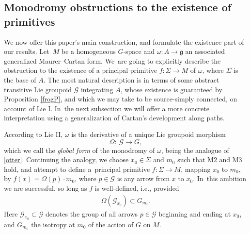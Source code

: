 \documentclass[11pt]{article}
\numberwithin{equation}{section}
\numberwithin{equation}{section}
\begin{document}
\subsection*{Monodromy obstructions to the existence of
 primitives}

We now offer this paper's main construction, and formulate the
existence part of our results. Let~$M$ be a homogeneous $G$-space and
$\omega \colon A \rightarrow {\mathfrak g} $ an associated generalized
Maurer--Cartan form. We~are going to explicitly describe the
obstruction to the existence of a principal primitive
$f \colon \Sigma \rightarrow M $ of $\omega $, where $\Sigma $ is the
base of $A$. The most natural description is in terms of some abstract
transitive Lie groupoid ${\mathcal G}$ integrating $A$, whose
existence is guaranteed by Proposition \ref{frogP}, and which we may
take to be source-simply connected, on account of Lie I. In~the next
subsection we will offer a more concrete interpretation using a
generalization of Cartan's development along paths.

According to Lie II, $\omega $ is the derivative of a unique Lie
groupoid morphism
\begin{equation}\label{global}
 \Omega \colon\ {\mathcal G} \rightarrow G,
\end{equation}
which we call the {\it global form} of the monodromy of $\omega $,
being the analogue of \eqref{otter}. Continuing the analogy, we
choose $x_0 \in \Sigma $ and $m_0$ such that M2 and M3 hold, and
attempt to define a~principal primitive
$f \colon \Sigma \rightarrow M$, mapping $x_0$ to $m_0$, by
$f(x)=\Omega(p)\cdot m_0 $, where $p \in {\mathcal G} $ is any arrow
from $x$ to $x_0$. In~this ambition we are successful, so long as $f$
is well-defined, i.e., provided
\begin{gather}
\Omega({\mathcal G}_{x_0}) \subset G_{m_0}.\label{newt}
\end{gather}
Here ${\mathcal G}_{x_0} \subset {\mathcal G}$ denotes
the group of all arrows $p \in {\mathcal G} $ beginning and ending at
$x_0$, and $G_{m_0}$ the isotropy at $m_0 $ of the action of $G$ on
$M$.
\end{document}

